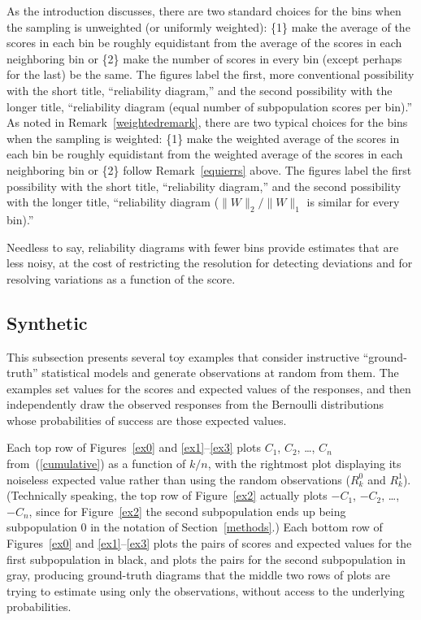 \documentclass{article}
\begin{document}
As the introduction discusses, there are two standard choices for the bins
when the sampling is unweighted (or uniformly weighted):
\{1\} make the average of the scores in each bin
be roughly equidistant from the average of the scores
in each neighboring bin or
\{2\} make the number of scores in every bin
(except perhaps for the last) be the same.
The figures label the first, more conventional possibility
with the short title, ``reliability diagram,'' and the second possibility
with the longer title,
``reliability diagram (equal number of subpopulation scores per bin).''
As noted in Remark~\ref{weightedremark}, there are two typical choices
for the bins when the sampling is weighted:
\{1\} make the weighted average of the scores in each bin
be roughly equidistant from the weighted average of the scores
in each neighboring bin or
\{2\} follow Remark~\ref{equierrs} above.
The figures label the first possibility with the short title,
``reliability diagram,'' and the second possibility
with the longer title,
``reliability diagram ($\|W\|_2/\|W\|_1$ is similar for every bin).''

Needless to say, reliability diagrams with fewer bins provide estimates
that are less noisy, at the cost of restricting the resolution
for detecting deviations and for resolving variations
as a function of the score.


\subsection{Synthetic}
\label{synthetic}

This subsection presents several toy examples
that consider instructive ``ground-truth'' statistical models
and generate observations at random from them.
The examples set values for the scores and expected values of the responses,
and then independently draw the observed responses
from the Bernoulli distributions whose probabilities of success
are those expected values.

Each top row of Figures~\ref{ex0} and \ref{ex1}--\ref{ex3}
plots $C_1$, $C_2$, \dots, $C_n$
from~(\ref{cumulative}) as a function of $k/n$,
with the rightmost plot displaying its noiseless expected value
rather than using the random observations ($R^0_k$ and $R^1_k$).
(Technically speaking, the top row of Figure~\ref{ex2} actually plots
$-C_1$, $-C_2$, \dots, $-C_n$, since for Figure~\ref{ex2}
the second subpopulation ends up being subpopulation 0
in the notation of Section~\ref{methods}.)
Each bottom row of Figures~\ref{ex0} and \ref{ex1}--\ref{ex3} plots the pairs
of scores and expected values for the first subpopulation in black,
and plots the pairs for the second subpopulation in gray,
producing ground-truth diagrams that the middle two rows of plots
are trying to estimate using only the observations,
without access to the underlying probabilities.
\end{document}
